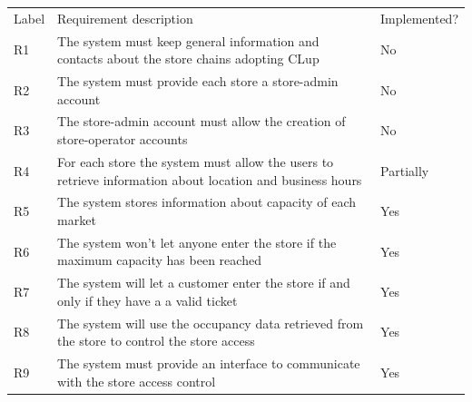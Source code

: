 \renewcommand{\arraystretch}{1.4}
\begin{tabular}{C{1cm}L{11cm}C{3.1cm}}
    Label & Requirement description & Implemented?                                                                                                                                                                     \\

    R1   & The system must keep general information and contacts about the store chains adopting CLup & No                                                                                                 \\
    R2   & The system must provide each store a store-admin account  & No                                                                                                                              \\
    R3   & The store-admin account must allow the creation of store-operator accounts &               No                                                                                                   \\
    R4   & For each store the system must allow the users to retrieve information about location and business hours   & Partially                                                                                \\
    R5   & The system stores information about capacity of each market & Yes                                                                                                                                \\
    R6   & The system won't let anyone enter the store if the maximum capacity has been reached  & Yes                                                                                                      \\
    R7   & The system will let a customer enter the store if and only if they have a a valid ticket  & Yes                                                                                                     \\
    R8   & The system will use the occupancy data retrieved from the store to control the store access      & Yes                                                                                    \\
    R9   & The system must provide an interface to communicate with the store access control     & Yes                                                                                                   \\

\end{tabular}
